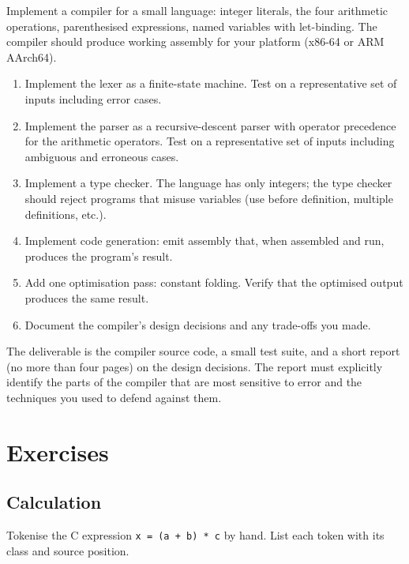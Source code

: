 \begin{project}
Implement a compiler for a small language: integer literals, the four arithmetic operations, parenthesised expressions, named variables with let-binding. The compiler should produce working assembly for your platform (x86-64 or ARM AArch64).

\begin{enumerate}[leftmargin=*]
  \item Implement the lexer as a finite-state machine. Test on a representative set of inputs including error cases.
  \item Implement the parser as a recursive-descent parser with operator precedence for the arithmetic operators. Test on a representative set of inputs including ambiguous and erroneous cases.
  \item Implement a type checker. The language has only integers; the type checker should reject programs that misuse variables (use before definition, multiple definitions, etc.).
  \item Implement code generation: emit assembly that, when assembled and run, produces the program's result.
  \item Add one optimisation pass: constant folding. Verify that the optimised output produces the same result.
  \item Document the compiler's design decisions and any trade-offs you made.
\end{enumerate}

The deliverable is the compiler source code, a small test suite, and a short report (no more than four pages) on the design decisions. The report must explicitly identify the parts of the compiler that are most sensitive to error and the techniques you used to defend against them.
\end{project}

\section{Exercises}

\subsection*{Calculation}

\begin{exercise}
Tokenise the C expression \texttt{x = (a + b) * c} by hand. List each token with its class and source position.
\end{exercise}

